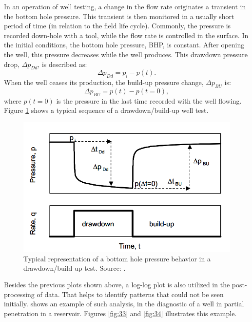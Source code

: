 In an operation of well testing, a change in the flow rate originates a transient in the bottom hole pressure. This transient is then monitored in a usually short period of time (in relation to the field life cycle). Commonly, the pressure is recorded down-hole with a tool, while the flow rate is controlled in the surface. In the initial conditions, the bottom hole pressure, BHP, is constant. After opening the well, this pressure decreases while the well produces. This drawdown pressure drop, $\Delta p_{Dd}$, is described as:
\begin{equation}
\label{wt1}
\Delta p_{Dd} = p_i - p(t).
\end{equation}
When the well ceases its production, the build-up pressure change, $\Delta p_{BU}$ is:
\begin{equation}
\label{wt2}
\Delta p_{BU} = p(t) - p(t=0),
\end{equation}
where $p(t=0)$ is the pressure in the last time recorded with the well flowing. Figure \ref{fig:31} shows a typical sequence of a drawdown/build-up well test.
\begin{figure}[H]
	\label{fig:31}
	\centering
	\includegraphics[width=0.8\linewidth]{Images/31}
	\caption{Typical representation of a bottom hole pressure behavior in a drawdown/build-up test. Source: \cite{Bourdet2002}.}
\end{figure}
\noindent
Besides the previous plots shown above, a log-log plot is also utilized in the post-processing of data. That helps to identify patterns that could not be seen initially. \cite{Bourdet2002} shows an example of such analysis, in the diagnostic of a well in partial penetration in a reservoir. Figures \ref{fig:33} and \ref{fig:34} illustrates this example. 
